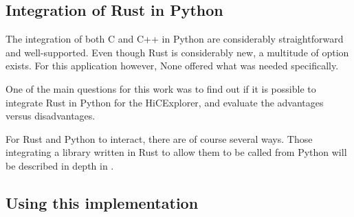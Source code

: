 

\subsection{Integration of Rust in Python}\label{sec:integration}


The integration of both C and C++ in Python are considerably straightforward
and well-supported. Even though Rust is considerably new, a multitude of option
exists. For this application however, None offered what was needed specifically.



One of the main questions for this work was to find out if it is possible to
integrate Rust in Python for the HiCExplorer, and evaluate the advantages
versus disadvantages.


For Rust and Python to interact, there are of course several ways. Those
integrating a library written in Rust to allow them to be called from Python
will be described in depth in .






\subsection{Using this implementation}\label{sec:using}






